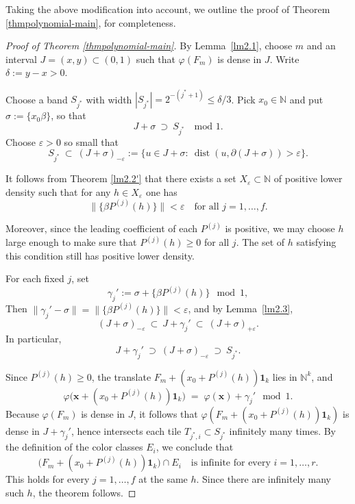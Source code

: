 \documentclass[11pt]{article}
\newcommand{\dist}{\operatorname{dist}}
\theoremstyle{definition}
\begin{document}
Taking the above modification into account, 
we outline the proof of Theorem \ref{thmpolynomial-main}, for com\-plete\-ness.
\begin{proof}[Proof of Theorem \ref{thmpolynomial-main}]
By Lemma~\ref{lm2.1}, choose $m$ and an interval $J=(x,y)\subset(0,1)$ such that $\varphi(F_m)$ is dense in $J$.
Write $\delta:=y-x>0$.

Choose a band $S_{j^\ast}$ with width $|S_{j^\ast}|=2^{-(j^\ast+1)}\le \delta/3$.
Pick $x_0\in\mathbb N$ and put $\sigma:=\{x_0\beta\}$, so that
\[
  J+\sigma\ \supset\ S_{j^\ast}\quad\text{mod }1.
\]
Choose $\varepsilon>0$ so small that
\[
  S_{j^\ast}\ \subset\ (J+\sigma)_{-\varepsilon}
  :=\{u\in J+\sigma:\ \dist(u,\partial(J+\sigma))>\varepsilon\}.
\]

It follows from Theorem \ref{lm2.2'} that there exists a set $X_{\varepsilon}\subset \mathbb{N}$ of positive lower density such that for any $h\in X_{\varepsilon}$ one has
\[
  \|\{\beta P^{(j)}(h)\}\|<\varepsilon \quad\text{for all } j=1,\dots,f.
\]

Moreover, since the leading coefficient of each $P^{(j)}$ is positive,
we may choose $h$ large enough to make sure that $P^{(j)}(h)\ge 0$ for all $j$. The set of $h$ satisfying this condition still has positive lower density.

For each fixed $j$, set
\[
  \gamma_j':=\sigma+ \{\beta P^{(j)}(h)\}\mod 1,
\]
Then $\|\gamma_j'-\sigma\|=\|\{\beta P^{(j)}(h)\}\|<\varepsilon$, and by Lemma~\ref{lm2.3},
\[
  (J+\sigma)_{-\varepsilon}\ \subset\ J+\gamma_j'\ \subset\ (J+\sigma)_{+\varepsilon}.
\]
In particular,
\[
  J+\gamma_j'\ \supset\ (J+\sigma)_{-\varepsilon}\ \supset\ S_{j^\ast}.
\]

Since $P^{(j)}(h)\ge 0$, the translate $F_m+(x_0+P^{(j)}(h))\mathbf{1}_k$ lies in $\mathbb N^k$, and
\[
  \varphi\!\big(\mathbf{x}+(x_0+P^{(j)}(h))\mathbf{1}_k\big)
  \;=\;\varphi(\mathbf{x})+\gamma_j' \mod 1.
\]
Because $\varphi(F_m)$ is dense in $J$, it follows that $\varphi(F_m+(x_0+P^{(j)}(h))\mathbf{1}_k)$
is dense in $J+\gamma_j'$, hence intersects each tile $T_{j^\ast,i}\subset S_{j^\ast}$ infinitely many times.
By the definition of the color classes $E_i$, we conclude that
\[
  \big(F_m+(x_0+P^{(j)}(h))\mathbf{1}_k\big)\cap E_i
  \quad\text{is infinite for every } i=1,\dots,r.
\]
This holds for every $j=1,\dots,f$ at the same $h$.
Since there are infinitely many such $h$,
the theorem follows. \end{proof}
\end{document}
